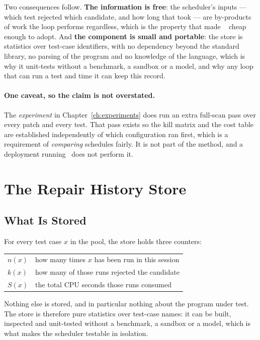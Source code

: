 Two consequences follow. \textbf{The information is free}: the scheduler's
inputs --- which test rejected which candidate, and how long that took --- are
by-products of work the loop performs regardless, which is the property that
made \frtp~\citep{qi2013frtp} cheap enough to adopt. And \textbf{the component
is small and portable}: the store is statistics over test-case identifiers, with
no dependency beyond the standard library, no parsing of the program and no
knowledge of the language, which is why it unit-tests without a benchmark, a
sandbox or a model, and why any loop that can run a test and time it can keep
this record.

\paragraph{One caveat, so the claim is not overstated.} The \emph{experiment} in
Chapter~\ref{ch:experiments} does run an extra full-scan  pass over
every patch and every test. That pass exists so the kill matrix and the cost
table are established independently of which configuration ran first, which is
a requirement of \emph{comparing} schedules fairly. It is not part of the
method, and a deployment running \caster\ does not perform it.

\section{The Repair History Store}
\label{sec:store}

\subsection{What Is Stored}

For every test case $x$ in the pool, the store holds three counters:

\begin{center}
\small
\begin{tabular}{@{}l l@{}}
\toprule
$n(x)$ & how many times $x$ has been run in this session\\
$k(x)$ & how many of those runs rejected the candidate\\
$S(x)$ & the total CPU seconds those runs consumed\\
\bottomrule
\end{tabular}
\end{center}

Nothing else is stored, and in particular nothing about the program under test.
The store is therefore pure statistics over test-case names: it can be built,
inspected and unit-tested without a benchmark, a sandbox or a model, which is
what makes the scheduler testable in isolation.

